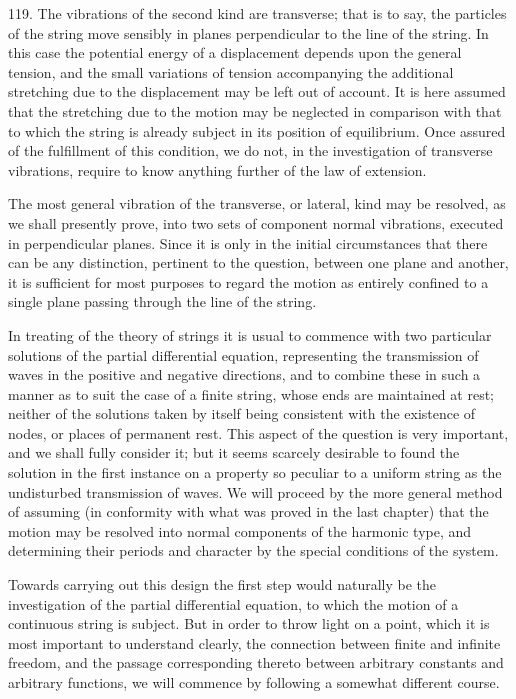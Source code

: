 119. The vibrations of the second kind are transverse; that is to say, the
particles of the string move sensibly in planes perpendicular to the line of
the string. In this case the potential energy of a displacement depends upon
the general tension, and the small variations of tension accompanying the
additional stretching due to the displacement may be left out of account. It is
here assumed that the stretching due to the motion may be neglected in
comparison with that to which the string is already subject in its position of
equilibrium. Once assured of the fulfillment of this condition, we do not, in
the investigation of transverse vibrations, require to know anything further of
the law of extension.

The most general vibration of the transverse, or lateral, kind may be resolved,
as we shall presently prove, into two sets of component normal vibrations,
executed in perpendicular planes. Since it is only in the initial circumstances
that there can be any distinction, pertinent to the question, between one plane
and another, it is sufficient for most purposes to regard the motion as
entirely confined to a single plane passing through the line of the string.

In treating of the theory of strings it is usual to commence with two
particular solutions of the partial differential equation, representing the
transmission of waves in the positive and negative directions, and to combine
these in such a manner as to suit the case of a finite string, whose ends are
maintained at rest; neither of the solutions taken by itself being consistent
with the existence of nodes, or places of permanent rest. This aspect of the
question is very important, and we shall fully consider it; but it seems
scarcely desirable to found the solution in the first instance on a property so
peculiar to a uniform string as the undisturbed transmission of waves. We will
proceed by the more general method of assuming (in conformity with what was
proved in the last chapter) that the motion may be resolved into normal
components of the harmonic type, and determining their periods and character by
the special conditions of the system.

Towards carrying out this design the first step would naturally be the
investigation of the partial differential equation, to which the motion of a
continuous string is subject. But in order to throw light on a point, which it
is most important to understand clearly, the connection between finite and
infinite freedom, and the passage corresponding thereto between arbitrary
constants and arbitrary functions, we will commence by following a somewhat
different course.

